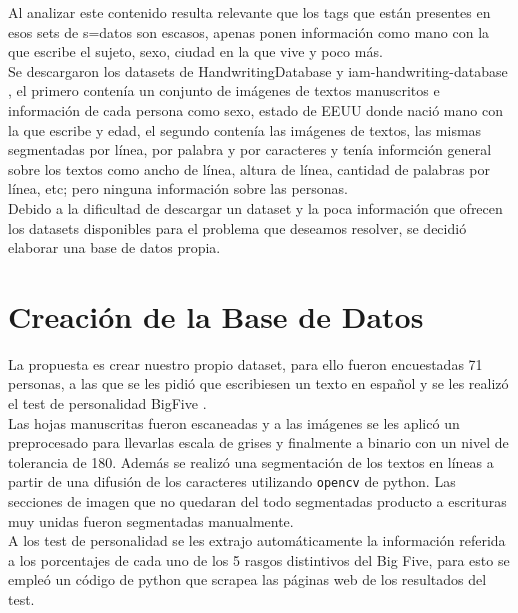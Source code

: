 \documentclass[10pt, a4paper]{article}
\begin{document}
        Al analizar este contenido resulta relevante que los tags que est\'an presentes en esos sets de s=datos son escasos, apenas ponen informaci\'on como mano con la que escribe el sujeto, sexo, 
        ciudad en la que vive y poco m\'as. \\ 

        Se descargaron los datasets de HandwritingDatabase \cite{DataSet1} y iam-handwriting-database \cite{DataSet2}, el primero conten\'ia un conjunto de im\'agenes de textos manuscritos e informaci\'on de cada persona como sexo, estado de EEUU donde naci\'o 
        mano con la que escribe y edad, el segundo conten\'ia las im\'agenes de textos, las mismas segmentadas por l\'inea, por palabra y por caracteres y ten\'ia informci\'on general sobre los textos como 
        ancho de l\'inea, altura de l\'inea, cantidad de palabras por l\'inea, etc; pero ninguna informaci\'on sobre las personas. \\ 

        Debido a la dificultad de descargar un dataset y la poca informaci\'on que ofrecen los datasets disponibles para el problema que deseamos resolver, se decidi\'o elaborar una base de datos propia.

    \section{Creaci\'on de la Base de Datos}

        La propuesta es crear nuestro propio dataset, para ello fueron encuestadas 71 personas, a las que se les pidi\'o que escribiesen un texto 
        en espa\~nol y se les realiz\'o el test de personalidad BigFive \cite{bigfivetest}. \\ 

        Las hojas manuscritas fueron escaneadas y a las im\'agenes se les aplic\'o un preprocesado para llevarlas escala de grises y finalmente a binario con un nivel de tolerancia de 180. Adem\'as se 
        realiz\'o una segmentaci\'on de los textos en l\'ineas a partir de una difusi\'on de los caracteres utilizando \texttt{opencv} de python. Las secciones de imagen que no quedaran 
        del todo segmentadas producto a escrituras muy unidas fueron segmentadas manualmente.\\ 

        A los test de personalidad se les extrajo autom\'aticamente la informaci\'on referida a los porcentajes de cada uno 
        de los 5 rasgos distintivos del Big Five, para esto se emple\'o un c\'odigo de python que scrapea las p\'aginas web de los resultados del test.\\ 
\end{document}

